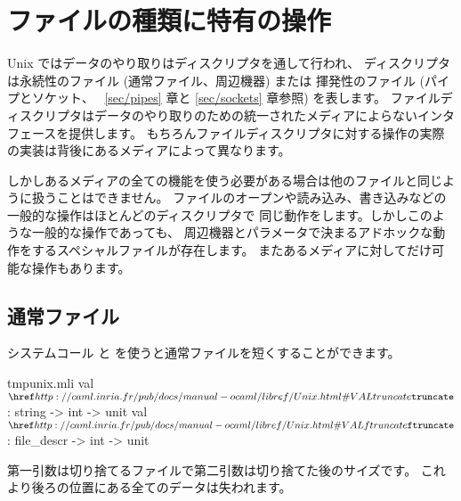 \section{ファイルの種類に特有の操作}

Unix ではデータのやり取りはディスクリプタを通して行われ、
ディスクリプタは永続性のファイル (通常ファイル、周辺機器) または
揮発性のファイル (パイプとソケット、 ~\ref{sec/pipes} 章と \ref{sec/sockets} 章参照) を表します。
ファイルディスクリプタはデータのやり取りのための統一されたメディアによらないインタフェースを提供します。
もちろんファイルディスクリプタに対する操作の実際の実装は背後にあるメディアによって異なります。

しかしあるメディアの全ての機能を使う必要がある場合は他のファイルと同じように扱うことはできません。
ファイルのオープンや読み込み、書き込みなどの一般的な操作はほとんどのディスクリプタで
同じ動作をします。しかしこのような一般的な操作であっても、
周辺機器とパラメータで決まるアドホックな動作をするスペシャルファイルが存在します。
またあるメディアに対してだけ可能な操作もあります。

\subsection*{通常ファイル}

システムコール  と  を使うと通常ファイルを短くすることができます。
%
\begin{listingcodefile}{tmpunix.mli}
val $\libvalue{Unix}{truncate}$  : string -> int -> unit
val $\libvalue{Unix}{ftruncate}$ : file_descr -> int -> unit
\end{listingcodefile}
%
第一引数は切り捨てるファイルで第二引数は切り捨てた後のサイズです。
これより後ろの位置にある全てのデータは失われます。

